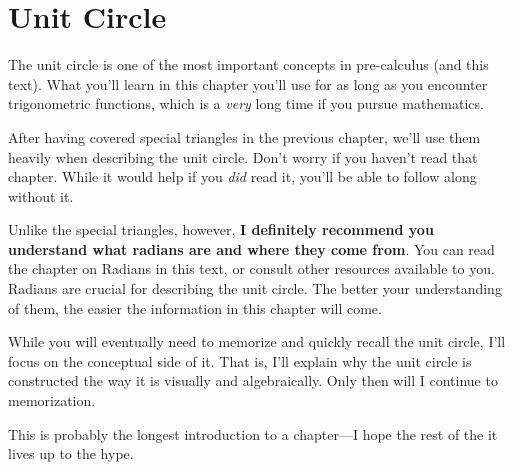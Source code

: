 \clearpage\chapter{Unit Circle}
The unit circle is one of the most important concepts in pre-calculus (and this text). What you'll learn in this chapter you'll use for as long as you encounter trigonometric functions, which is a \textit{very} long time if you pursue mathematics.

After having covered special triangles in the previous chapter, we'll use them heavily when describing the unit circle. Don't worry if you haven't read that chapter. While it would help if you \textit{did} read it, you'll be able to follow along without it.

Unlike the special triangles, however, \textbf{I definitely recommend you understand what radians are and where they come from}. You can read the chapter on Radians in this text, or consult other resources available to you. Radians are crucial for describing the unit circle. The better your understanding of them, the easier the information in this chapter will come.

While you will eventually need to memorize and quickly recall the unit circle, I'll focus on the conceptual side of it. That is, I'll explain why the unit circle is constructed the way it is visually and algebraically. Only then will I continue to memorization.

This is probably the longest introduction to a chapter---I hope the rest of the it lives up to the hype.
